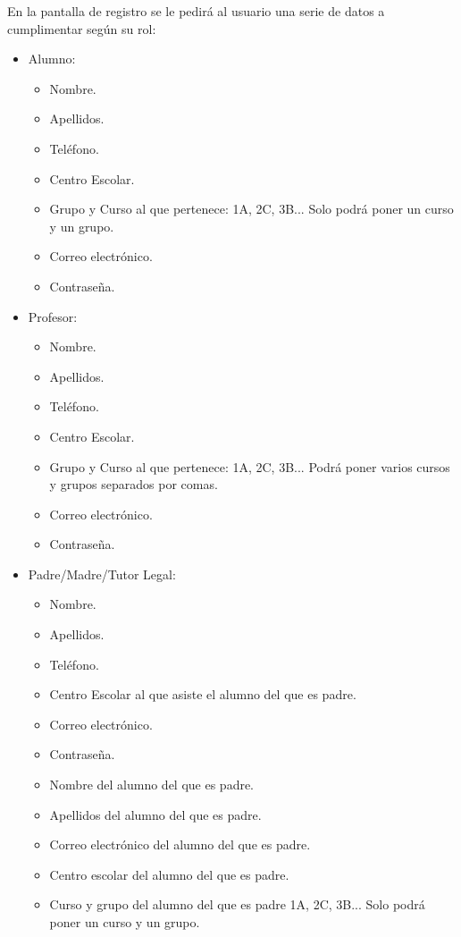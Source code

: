 		En la pantalla de registro se le pedirá al usuario una serie de datos a cumplimentar según su rol: 
		\begin{itemize}
			\item Alumno:
				\begin{itemize}
					\item Nombre.
					\item Apellidos.
					\item Teléfono.
					\item Centro Escolar.
					\item Grupo y Curso al que pertenece: 1A, 2C, 3B... Solo podrá poner un curso y un grupo.
					\item Correo electrónico.
					\item Contraseña.
				\end{itemize}
			\item Profesor:
				\begin{itemize}
					\item Nombre.
					\item Apellidos.
					\item Teléfono.
					\item Centro Escolar.
					\item Grupo y Curso al que pertenece: 1A, 2C, 3B... Podrá poner varios cursos y grupos separados por comas.
					\item Correo electrónico.
					\item Contraseña.
				\end{itemize}
			\item Padre/Madre/Tutor Legal:
				\begin{itemize}
					\item Nombre.
					\item Apellidos.
					\item Teléfono.
					\item Centro Escolar al que asiste el alumno del que es padre.
					\item Correo electrónico.
					\item Contraseña.
					\item Nombre del alumno del que es padre.
					\item Apellidos del alumno del que es padre.
					\item Correo electrónico del alumno del que es padre.
					\item Centro escolar del alumno del que es padre.
					\item Curso y grupo del alumno del que es padre 1A, 2C, 3B... Solo podrá poner un curso y un grupo.
				\end{itemize}
		\end{itemize}
		
